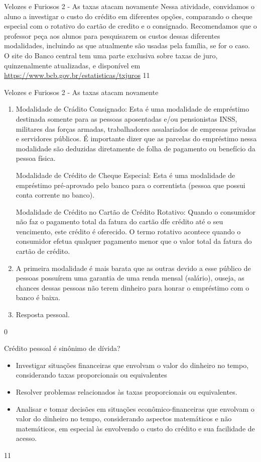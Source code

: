 \begin{sugestions}{Velozes e Furiosos 2 - As taxas atacam novamente}
{
Nessa atividade, convidamos o aluno a investigar o custo do crédito em diferentes opções, comparando o cheque especial com o rotativo do cartão de credito e o consignado. Recomendamos que o professor peça aos alunos para pesquisarem os custos dessas diferentes modalidades, incluindo as que atualmente são usadas pela família, se for o caso. O site do Banco central tem uma parte exclusiva sobre taxas de juro, quinzenalmente atualizadas, e disponível em \url{https://www.bcb.gov.br/estatisticas/txjuros}
}{1}{1}
\end{sugestions}
\begin{answer}{Velozes e Furiosos 2 - As taxas atacam novamente}
{
  \begin{enumerate}
    \item Modalidade de Crádito Consignado: Esta é uma modalidade de empréstimo destinada somente para as pessoas aposentadas e/ou pensionistas INSS, militares das forças armadas, trabalhadores assalariados de empresas privadas e servidores públicos. É importante dizer que as parcelas do empréstimo nessa modalidade são deduzidas diretamente de folha de pagamento ou benefício da pessoa física.

    Modalidade de Crédito de Cheque Especial: Esta é uma modalidade de empréstimo pré-aprovado pelo banco para o correntista (pessoa que possui conta corrente no banco).

    Modalidade de Crédito no Cartão de Crédito Rotativo: Quando o consumidor não faz o pagamento total da fatura do cartão dfe crédito até o seu vencimento, este crédito é oferecido. O termo rotativo acontece quando o consumidor efetua qualquer pagamento menor que o valor total da fatura do cartão de crédito.

    \item A primeira modalidade é mais barata que as outras devido a esse público de pessoas possuírem uma garantia de uma renda mensal (salário), ouseja, as chances dessas pessoas não terem dinheiro para honrar o empréstimo com o banco é baixa.

    \item Resposta pessoal.
  \end{enumerate}
}{0}
\end{answer}
\begin{objectives}{Crédito pessoal é sinônimo de dívida?}
{
\begin{itemize}
\item Investigar situações financeiras que envolvam o valor do dinheiro no tempo, considerando taxas proporcionais ou equivalentes
\item Resolver problemas relacionados às taxas proporcionais ou equivalentes.
\item Analisar e tomar decisões em situações econômico-financeiras que envolvam o valor do dinheiro no tempo, considerando aspectos matemáticos e não matemáticos, em especial às envolvendo o custo do crédito e sua facilidade de acesso.
\end{itemize}
}{1}{1}
\end{objectives}
